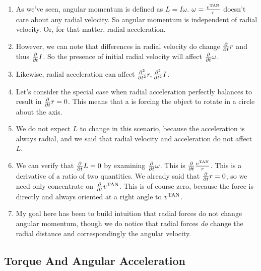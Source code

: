 \begin{enumerate}
  \item As we've seen, angular momentum is defined as $L = I \omega$.
  $\omega = \frac{v^{\text{TAN}}}{r}$ doesn't care about any radial velocity. So
  angular momentum is independent of radial velocity. Or, for that
  matter, radial acceleration.

  \item However, we can note that differences in radial velocity do
  change $\frac{\partial }{\partial t} r$ and thus $\frac{\partial }{\partial t} I$. So the presence of
  initial radial velocity will affect $\frac{\partial }{\partial t} \omega$.

  \item Likewise, radial acceleration can affect $\frac{\partial^2 }{\partial {t}^2} r,
  \frac{\partial^2 }{\partial {t}^2} I$.

  \item Let's consider the special case when radial acceleration
  perfectly balances to result in $\frac{\partial }{\partial t} r = 0$. This means that
  a  is forcing the object to rotate in a
  circle about the axis.

  \item We do not expect $L$ to change in this scenario, because the
  acceleration is always radial, and we said that radial velocity and
  acceleration do not affect $L$.

  \item We can verify that $\frac{\partial }{\partial t} L = 0$ by examining
  $\frac{\partial }{\partial t} \omega$. This is $\frac{\partial }{\partial t} \frac{v^{\text{TAN}}}{r}$. This is
  a derivative of a ratio of two quantities. We already said that
  $\frac{\partial }{\partial t} r = 0$, so we need only concentrate on $\frac{\partial }{\partial t}
  v^{\text{TAN}}$. This is of course zero, because the force is directly and
  always oriented at a right angle to $v^{\text{TAN}}$.

  \item My goal here has been to build intuition that radial forces do
  not change angular momentum, though we do notice that radial forces
  \emph{do} change the radial distance and correspondingly the angular
  velocity.
\end{enumerate}

\subsection{Torque And Angular Acceleration}

